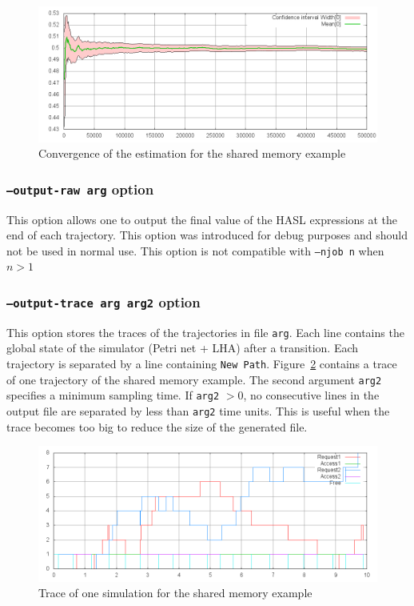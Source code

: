 \documentclass{article}
\begin{document}
\begin{figure}[h]
  \centering
  \includegraphics[width=1.01\textwidth]{figures/convergence.png}
  \caption{Convergence of the estimation for the shared memory example}
  \label{fig:convergence}
\end{figure}

\subsubsection{\texttt{--output-raw arg} option}
This option allows one to output the final value of the HASL
expressions at the end of each trajectory. This option was introduced for debug purposes and should not be used in normal use. This option
is not compatible with \texttt{--njob n} when $n>1$

\subsubsection{\texttt{--output-trace arg arg2} option}
This option stores the traces of the trajectories in file
\texttt{arg}.  Each line contains the global state of the simulator
(Petri net + LHA) after a transition.  Each trajectory is separated by
a line containing \texttt{New Path}.  Figure~\ref{fig:trace} contains
a trace of one trajectory of the shared memory example.  The second
argument \texttt{arg2} specifies a minimum sampling time. If
\texttt{arg2} $>0$, no consecutive lines in the output file are
separated by less than \texttt{arg2} time units. This is useful when
the trace becomes too big to reduce the size of the generated file.

\begin{figure}[h]
  \centering
  \includegraphics[width=1.01\textwidth]{figures/trace.png}
  \caption{Trace of one simulation for the shared memory example}
  \label{fig:trace}
\end{figure}
\end{document}
